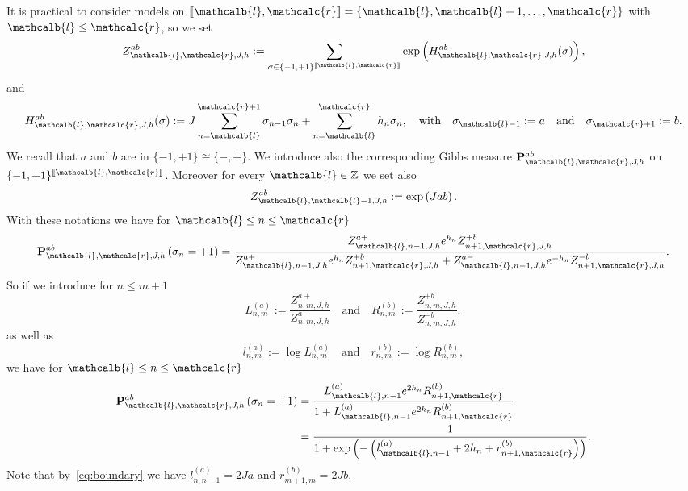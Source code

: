 \documentclass[AHL,Unicode,longabstracts,published]{cedram}
\newcommand{\bP}{\mathbf{P}}
\newcommand{\bbZ}{\mathbb{Z}}
\newcommand{\gs}{\sigma}
\renewcommand{\ell}{\mathcalb{l}}
\newcommand{\err}{\mathcalc{r}}
\newcommand{\llbracket}{\mathopen{[\mkern -2.7mu[}}
\newcommand{\rrbracket}{\mathclose{]\mkern -2.7mu]}}
\newcommand{\lbra}{\llbracket}
\newcommand{\rbra}{\rrbracket}
\begin{document}
It is practical to consider models on $\lbra\ell, \err \rbra=\{\ell,\ell+1, \dots, \err\}$ with $\ell \le \err$, so we set
\begin{equation}\label{eq:defZellerr}
Z_{\ell, \err, J, h}^{ab}:= \sum_{\gs \in \{-1, +1\}^{\lbra\ell, \err \rbra}} \exp\left(H^{ab}_{\ell, \err, J, h} (\gs)\right),
\end{equation}
and
\begin{equation}\label{eq:defHellerr}
H^{ab}_{\ell, \err, J, h} (\gs):= J \sum_{n=\ell}^{\err+1} \gs_{n-1}\gs_n + \sum_{n=\ell}^\err h_n \gs_n, \quad \text{with}\quad \gs_{\ell-1}:=a \quad\text{and}\quad
\gs_{\err+1}:=b.
\end{equation}
We recall that $a$ and $b$ are in $\{-1, +1\} \cong \{ -, +\}$. We introduce also the corresponding Gibbs measure $\bP_{\ell, \err, J, h}^{ab}$ on $\{-1, +1\}^{\lbra\ell, \err \rbra}$. Moreover for every $\ell \in \bbZ$ we set also
\begin{equation}\label{eq:boundary}
Z_{\ell, \ell-1, J, h}^{ab}:= \exp\left(J ab\right).
\end{equation}
With these notations we have for $\ell \le n \le \err$
\begin{equation}
\bP_{\ell, \err, J, h}^{ab}\left(\gs_n=+1\right)=\frac{ {Z}_{\ell, n-1, J, h}^{a+} e^{h_n}{Z}_{n+1,\err, J, h}^{+b}} {{Z}_{\ell, n-1, J, h}^{a+} e^{h_n}{Z}_{n+1,\err, J, h}^{+b} +{Z}_{\ell, n-1, J, h}^{a-} e^{-h_n}{Z}_{n+1,\err, J, h}^{-b}}.
\end{equation}
So if we introduce for $n\le m+1$
\begin{equation}\label{eq:LaRb}
L^{(a)}_{n,m}:= \frac{ {Z}_{n, m, J, h}^{a+}}{ {Z}_{n, m, J, h}^{a-}}\quad\text{and} \quad R^{(b)}_{n,m}:= \frac{{Z}_{n,m, J,h}^{+b}}{ {Z}_{n,m, J, h}^{-b}},
\end{equation}
as well as
\begin{equation}
l^{(a)}_{n,m} := \log L_{n,m}^{(a)} \quad\text{and} \quad r^{(b)}_{n,m}:= \log R_{n,m}^{(b)},
\end{equation}
we have for $\ell\le n \le \err$
\begin{equation}\label{eq:Psigmaj}
\begin{aligned}
\bP^{ab}_{\ell, \err, J, h}\left(\gs_n=+1\right) &= \frac {L_{\ell,n-1}^{(a)} e^{2h_n} R_{n+1,\err}^{(b)}} {1+ L_{\ell,n-1}^{(a)} e^{2h_n} R_{n+1,\err}^{(b)}}\\
&=
\frac 1 {1+ \exp\left(-\left(l_{\ell,n-1}^{(a)} +2h_n+ r_{n+1, \err}^{(b)}\right)\right)}.
\end{aligned}
\end{equation}
Note that by~\eqref{eq:boundary} we have $l^{(a)}_{n,n-1}=2Ja$ and $r^{(b)}_{m+1,m}=2Jb$.
\end{document}
